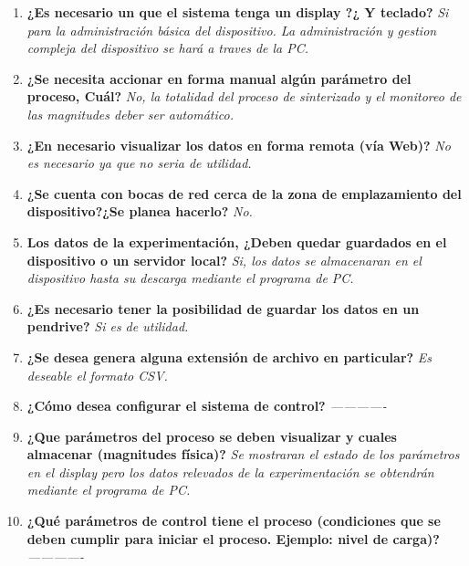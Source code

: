 \documentclass[12pt]{article}
\begin{document}
\begin{enumerate}
\begin{enumerate}
	  \item \textbf{ ¿Es necesario un que el sistema tenga un display ?¿ Y teclado? }
		\subitem	\textit{ Si para la administración básica del dispositivo. La administración y gestion compleja del dispositivo se hará
					 a traves de la PC.
				}

	  \item \textbf{ ¿Se necesita accionar en forma manual algún parámetro del proceso, Cuál? }
		\subitem	\textit{ No, la totalidad del proceso de sinterizado y el monitoreo de las magnitudes deber ser automático.
				}

	  \item \textbf{ ¿En necesario visualizar los datos en forma remota (vía Web)? }
		\subitem	\textit{ No es necesario ya que no seria de utilidad.
				}

	  \item \textbf{ ¿Se cuenta con bocas de red cerca de la zona de emplazamiento del dispositivo?¿Se planea hacerlo? }
		\subitem	\textit{ No.
				} 

	  \item \textbf{ Los datos de la experimentación, ¿Deben quedar guardados en el dispositivo o un servidor local? }
		\subitem	\textit{ Si, los datos se almacenaran en el dispositivo hasta su descarga mediante el programa de PC.
				}

	  \item \textbf{ ¿Es necesario tener la posibilidad de guardar los datos en un pendrive? }
		\subitem	\textit{ Si es de utilidad.
				}

	  \item \textbf{ ¿Se desea genera alguna extensión de archivo en particular? }
		\subitem	\textit{ Es deseable el formato CSV.
				}

	  \item \textbf{ ¿Cómo desea configurar el sistema de control? }
		\subitem	\textit{ -------------
				}

	  \item \textbf{ ¿Que parámetros del proceso se deben visualizar y cuales almacenar (magnitudes física)? }
		\subitem	\textit{ Se mostraran el estado de los parámetros en el display pero los datos relevados de la experimentación se
					  obtendrán mediante el programa de PC.
				}

	  \item \textbf{ ¿Qué parámetros de control tiene el proceso (condiciones que se deben cumplir para iniciar el proceso. Ejemplo: nivel de carga)? }
		\subitem	\textit{ -------------
				}


\end{enumerate}
\end{enumerate}
\end{document}
